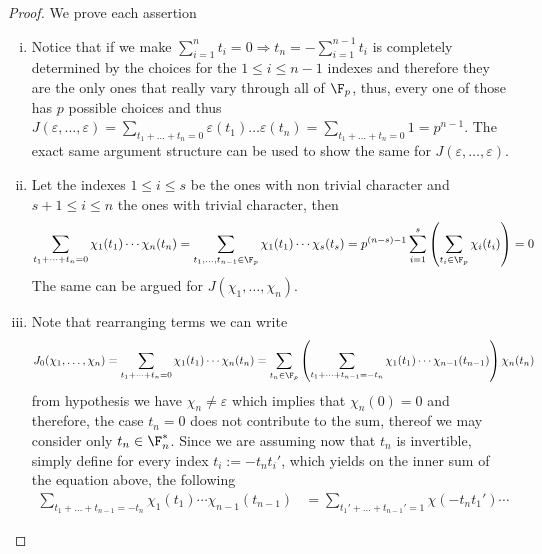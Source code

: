 \begin{proof}
    We prove each assertion
    \begin{enumerate}[i.]
        \item Notice that if we make \( \sum_{i=1}^{n}t_i = 0 \Rightarrow t_n =
              -\sum_{i=1}^{n-1} t_i\) is completely determined by the choices for the
              \(1 \leqslant i \leqslant n-1\) indexes and therefore they are the only
              ones that really vary through all of \(\F_p\), thus, every one of those
              has \(p\) possible choices and thus \(J(\varepsilon, \dots, \varepsilon) =
              \sum_{t_1+\dots+t_n = 0} \varepsilon(t_1)\dots \varepsilon(t_n) =
              \sum_{t_1 + \dots + t_n = 0} 1 = p^{n-1}\). The exact same argument
              structure can be used to show the same for \(J(\varepsilon, \dots,
              \varepsilon)\).
        \item Let the indexes \(1 \leqslant i \leqslant s\) be the ones with non
              trivial character and \(s+1 \leqslant i \leqslant n\) the ones with
              trivial character, then
              \[
                  \sum_{t_1+\dots+t_n=0} \chi_1(t_1) \cdots \chi_n(t_n)
                  = \sum_{t_1,\dots,t_{n-1} \in \F_p} \chi_1(t_1) \cdots \chi_s(t_s)
                  = p^{(n-s) - 1} \sum_{i=1}^{s} \left( \sum_{t_i \in \F_p}
                  \chi_i(t_i) \right) = 0
              \]
              The same can be argued for \(J(\chi_1, \dots, \chi_n)\).
        \item Note that rearranging terms we can write
              \[
                  J_0(\chi_1, \dots, \chi_n) = \sum_{t_1+\dots+t_n=0} \chi_1(t_1)
                  \cdots \chi_n(t_n) = \sum_{t_n \in \F_p} \left( \sum_{t_1 + \dots +
                      t_{n-1} = -t_n} \chi_1(t_1)\cdots\chi_{n-1}(t_{n-1})\right)
                  \chi_n(t_n)
              \]
              from hypothesis we have \(\chi_n \neq \varepsilon\) which implies that
              \(\chi_n(0) = 0\) and therefore, the case \(t_n=0\) does not contribute
              to the sum, thereof  we may consider only \(t_n \in \F_n^\ast\). Since
              we are assuming now that \(t_n\) is invertible, simply define for every
              index \(t_i := -t_n t_i'\), which yields on the inner sum of the
              equation above, the following
              \begin{align*}
                  \sum_{t_1 + \dots + t_{n-1} = -t_n}
                  \chi_1(t_1)\cdots\chi_{n-1}(t_{n-1})
                   & = \sum_{t_1' + \dots + t_{n-1}' = 1} \chi(-t_nt_1') \cdots

\end{align*}
\end{enumerate}
\end{proof}
